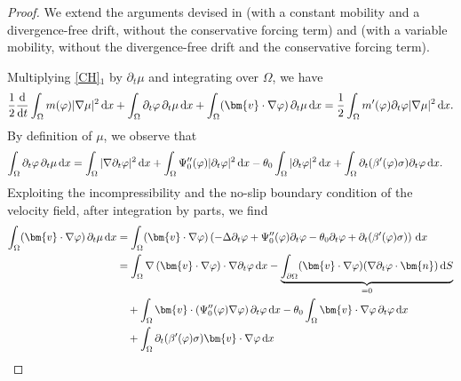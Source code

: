 \documentclass[11pt,reqno]{amsart}
\def\d{{\rm d}}
\def\ddt{\frac{\d}{\d t}}
\def\n{{\bm{n}}}
\def\vv{\bm{v}}
\begin{document}
%
\begin{proof}
We extend the arguments devised in \cite[Theorem 2.4]{AGG2023} (with a constant mobility and a divergence-free drift, without the conservative forcing term) and \cite[Section 4]{CGGG} (with a variable mobility, without the divergence-free drift and the conservative forcing term).

Multiplying \eqref{CH}$_1$ by $\partial_t \mu$ and integrating over $\Omega$, we have
$$
\frac12 \ddt \int_\Omega m(\varphi) |\nabla \mu |^2\,\mathrm{d}x
+ \int_{\Omega} \partial_t \varphi \, \partial_t \mu \,\d x + \int_{\Omega} (\vv \cdot \nabla \varphi) \, \partial_t \mu \, \d x
=\frac12\int_\Omega m'(\varphi)\partial_t\varphi|\nabla \mu|^2\,\mathrm{d}x.
$$
By definition of $\mu$, we observe that
\begin{align}
\int_{\Omega} \partial_t \varphi \, \partial_t \mu \,\d x
&= \int_{\Omega} |\nabla \partial_t \varphi|^2 \, \d x + \int_{\Omega}\Psi_0''(\varphi) |\partial_t \varphi |^2 \, \d x- \theta_0 \int_{\Omega}  |\partial_t \varphi |^2 \, \d x
+ \int_\Omega \partial_t (\beta'(\varphi)\sigma)  \partial_t \varphi \,\mathrm{d}x.
\notag
\end{align}
%
Exploiting the incompressibility and the no-slip boundary condition of the velocity field, after integration by parts, we find
%
\begin{align*}
\int_{\Omega} (\vv \cdot \nabla \varphi) \, \partial_t \mu \, \d x
&= \int_{\Omega} (\vv \cdot \nabla \varphi)  \left(-\Delta \partial_t \varphi +\Psi_0''(\varphi)\partial_t \varphi -\theta_0 \partial_t  \varphi + \partial_t (\beta'(\varphi)\sigma)
\right) \, \d x\\
&=  \int_{\Omega} \nabla \left( \vv \cdot \nabla \varphi\right) \cdot \nabla \partial_t \varphi \, \d x
- \underbrace{\int_{\partial \Omega} (\vv \cdot \nabla \varphi) (\nabla \partial_t \varphi \cdot \n) \, \d S}_{=0}
\\
&\quad  + \int_{\Omega} \vv \cdot \left(\Psi_0''(\varphi) \nabla \varphi \right) \partial_t \varphi \, \d x
- \theta_0 \int_{\Omega} \vv \cdot \nabla \varphi \, \partial_t \varphi \, \d x
\\
&\quad
+ \int_\Omega \partial_t (\beta'(\varphi)\sigma)  \vv \cdot \nabla \varphi  \,\mathrm{d}x
\\

\end{align*}
\end{proof}
\end{document}

